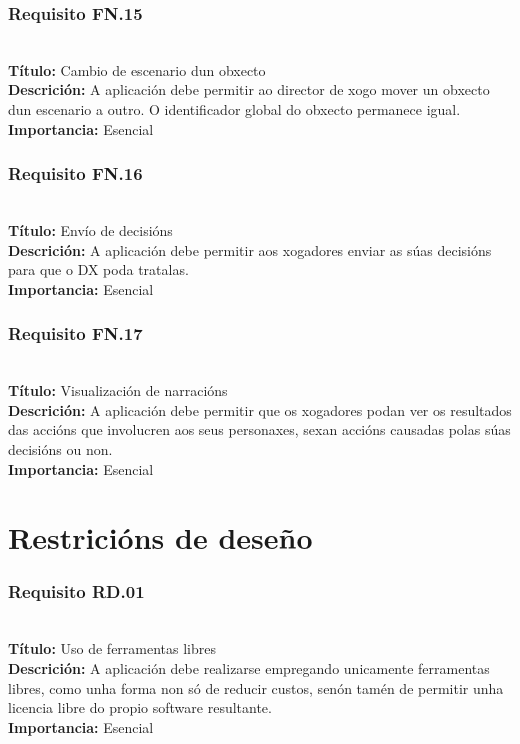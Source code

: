\subsubsection{Requisito FN.15}~\\
{\bf Título:} Cambio de escenario dun obxecto\\
{\bf Descrición:} A aplicación debe permitir ao director de xogo mover un
obxecto dun escenario a outro. O identificador global do obxecto permanece
igual.\\
{\bf Importancia:} Esencial

\subsubsection{Requisito FN.16}~\\
{\bf Título:} Envío de decisións\\
{\bf Descrición:} A aplicación debe permitir aos xogadores enviar as súas
decisións para que o DX poda tratalas.\\
{\bf Importancia:} Esencial

\subsubsection{Requisito FN.17}~\\
{\bf Título:} Visualización de narracións\\
{\bf Descrición:} A aplicación debe permitir que os xogadores podan ver os
resultados das accións que involucren aos seus personaxes, sexan accións
causadas polas súas decisións ou non.\\
{\bf Importancia:} Esencial


\section{Restricións de deseño}

\subsubsection{Requisito RD.01}~\\
{\bf Título:} Uso de ferramentas libres\\
{\bf Descrición:} A aplicación debe realizarse empregando unicamente
ferramentas libres, como unha forma non só de reducir custos, senón tamén de
permitir unha licencia libre do propio software resultante.\\
{\bf Importancia:} Esencial


